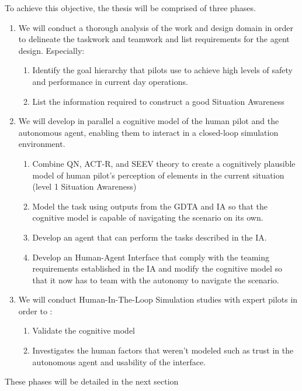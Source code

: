 \documentclass[12pt,a4paper]{article} %
\begin{document}
	To achieve this objective, the thesis will be comprised of three phases.
	\begin{enumerate}[label=\textbf{\arabic*.}]
		\item We will conduct a thorough analysis of the work and design domain in order to delineate the taskwork and teamwork and list requirements for the agent design. Especially:
		\begin{enumerate}[label=\textbf{\arabic{enumi}.\Alph*.}]
			\item \label{obj:1a} Identify the goal hierarchy that pilots use to achieve high levels of safety and performance in current day operations.
			\item \label{obj:1b} List the information required to construct a good Situation Awareness 
		\end{enumerate}
		\item We will develop in parallel a cognitive model of the human pilot and the autonomous agent, enabling them to interact in a closed-loop simulation environment. 
		\begin{enumerate}[label=\textbf{\arabic{enumi}.\Alph*.}]
			\item \label{obj:2a} Combine QN, ACT-R, and SEEV theory to create a cognitively plausible model of human pilot's perception of elements in the current situation (level 1 Situation Awareness)
			\item \label{obj:2b} Model the task using outputs from the GDTA and IA so that the cognitive model is capable of navigating the scenario on its own.
			\item \label{obj:2c} Develop an agent that can perform the tasks described in the IA.
			\item \label{obj:2d} Develop an Human-Agent Interface that comply with the teaming requirements established in the IA and modify the cognitive model so that it now has to team with the autonomy to navigate the scenario.
		\end{enumerate}  
		\item We will conduct Human-In-The-Loop Simulation studies with expert pilots in order to :
		\begin{enumerate}[label=\textbf{\arabic{enumi}.\Alph*.}]
			\item \label{obj:3a} Validate the cognitive model
			\item \label{obj:3b} Investigates the human factors that weren't modeled such as trust in the autonomous agent and usability of the interface.
		\end{enumerate}
	\end{enumerate}
	These phases will be detailed in the next section 
\end{document}
